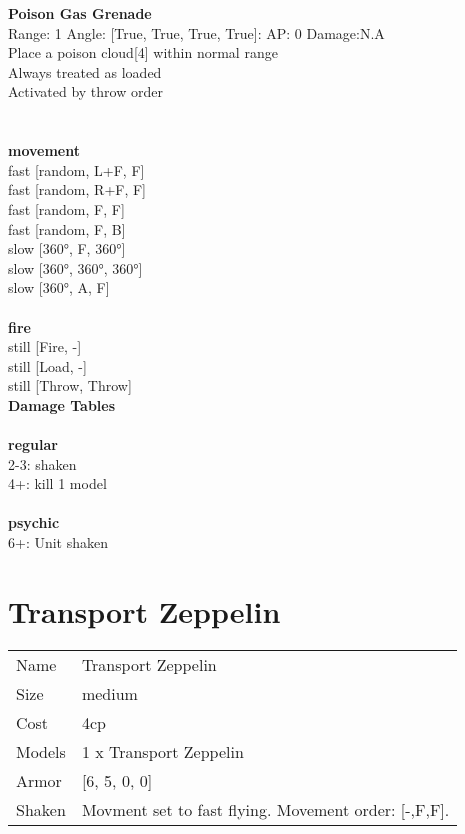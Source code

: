 {\bf Poison Gas Grenade } \\



Range: 1  Angle: [True, True, True, True]: AP: 0 Damage:N.A \\
Place a poison cloud[4] within normal range\\ 
Always treated as loaded\\ 
Activated by throw order\\ 




 
\ \\



\ \\ {\bf movement } \\
fast [random, L+F, F] \\
fast [random, R+F, F] \\
fast [random, F, F] \\
fast [random, F, B] \\
slow [360°, F, 360°] \\
slow [360°, 360°, 360°] \\
slow [360°, A, F] \\
\ \\ {\bf fire } \\
still [Fire, -] \\
still [Load, -] \\
still [Throw, Throw] \\


{\bf Damage Tables} \\
\ \\ {\bf regular } \\
2-3: shaken \\
4+: kill 1 model \\
\ \\ {\bf psychic } \\
6+: Unit shaken \\










\pagebreak\pagebreak

\section{ Transport Zeppelin }

\begin{tabular}{ll}
  Name & Transport Zeppelin \\
  Size & medium\\
  Cost & 4cp\\
  Models & 1 x Transport Zeppelin\\
  Armor & [6, 5, 0, 0]\\
  Shaken & Movment set to fast flying. Movement order: [-,F,F].\\
\end{tabular}

